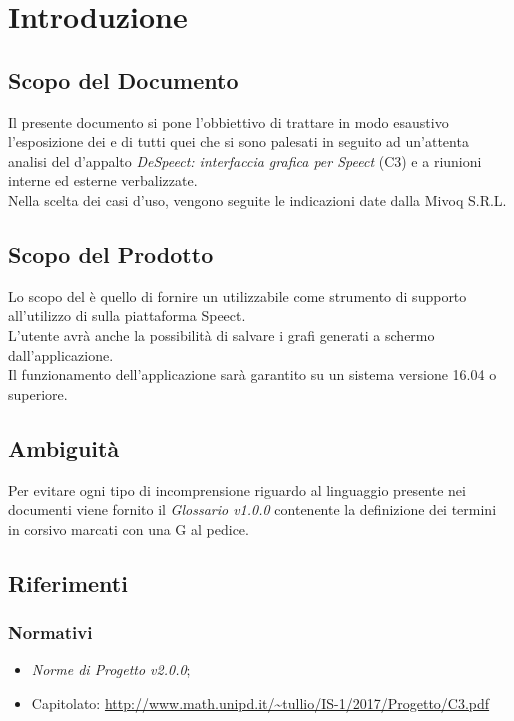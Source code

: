 \documentclass[./AnalisideiRequisiti.tex]{subfiles}
\begin{document}
	
\chapter{Introduzione}
\section{Scopo del Documento}
Il presente documento si pone l’obbiettivo di trattare in modo esaustivo l’esposizione dei  e di tutti quei  che si sono palesati in seguito ad un’attenta analisi del  d’appalto \textit{DeSpeect: interfaccia grafica per Speect} (C3) e a riunioni interne ed esterne verbalizzate.
\\ \noindent Nella scelta dei casi d'uso, vengono seguite le indicazioni date dalla  Mivoq S.R.L.

\section{Scopo del Prodotto}

Lo scopo del  è quello di fornire un  utilizzabile come strumento di supporto all'utilizzo di  sulla piattaforma Speect. 
\\ \noindent L'utente avrà anche la possibilità di salvare i grafi generati a schermo dall'applicazione.
\\ \noindent Il funzionamento dell'applicazione sarà garantito su un sistema  versione 16.04 o superiore.

\section{Ambiguità}
Per evitare ogni tipo di incomprensione riguardo al linguaggio presente nei documenti viene fornito il \textit{Glossario v1.0.0} contenente la definizione dei termini in corsivo marcati con una G al pedice.

\section{Riferimenti}
\subsection{Normativi}
\begin{itemize}
	\item \textit{Norme di Progetto v2.0.0};
	\item Capitolato: \url{http://www.math.unipd.it/~tullio/IS-1/2017/Progetto/C3.pdf}
\end{itemize}
\end{document}
